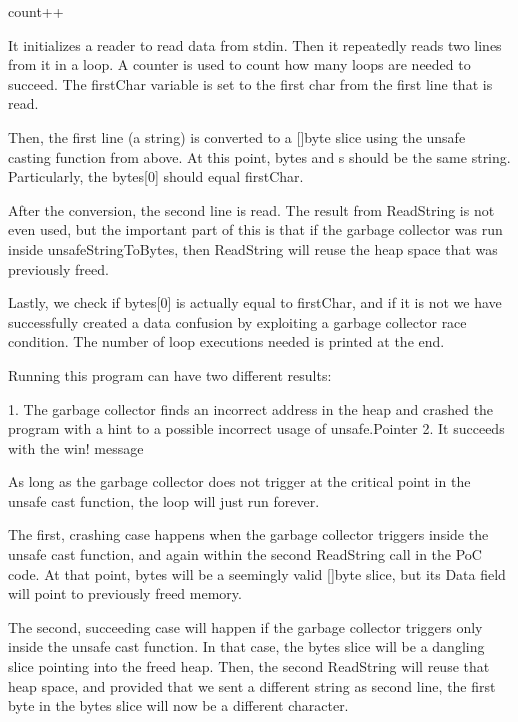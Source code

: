         count++



        It initializes a reader to read data from stdin. Then it repeatedly reads two lines from it in a loop. A counter is
        used to count how many loops are needed to succeed. The firstChar variable is set to the first char from the first
        line that is read.

        Then, the first line (a string) is converted to a []byte slice using the unsafe casting function from above. At this
        point, bytes and s should be the same string. Particularly, the bytes[0] should equal firstChar.

        After the conversion, the second line is read. The result from ReadString is not even used, but the important part of
        this is that if the garbage collector was run inside unsafeStringToBytes, then ReadString will reuse the heap space
        that was previously freed.

        Lastly, we check if bytes[0] is actually equal to firstChar, and if it is not we have successfully created a data
        confusion by exploiting a garbage collector race condition. The number of loop executions needed is printed at the end.

        Running this program can have two different results:

        1. The garbage collector finds an incorrect address in the heap and crashed the program with a hint to a possible
        incorrect usage of unsafe.Pointer
        2. It succeeds with the win! message

        As long as the garbage collector does not trigger at the critical point in the unsafe cast function, the loop will just
        run forever.

        The first, crashing case happens when the garbage collector triggers inside the unsafe cast function, and again within
        the second ReadString call in the PoC code. At that point, bytes will be a seemingly valid []byte slice, but its
        Data field will point to previously freed memory.

        The second, succeeding case will happen if the garbage collector triggers only inside the unsafe cast function. In that
        case, the bytes slice will be a dangling slice pointing into the freed heap. Then, the second ReadString will reuse
        that heap space, and provided that we sent a different string as second line, the first byte in the bytes slice will
        now be a different character.

